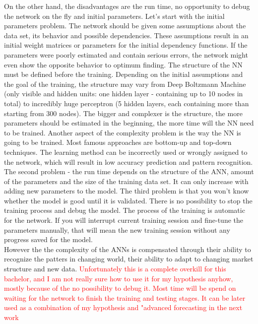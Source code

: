\documentclass[12pt, a4paper]{article}
\begin{document}
On the other hand, the disadvantages are the run time, no opportunity to debug the network on the fly and initial parameters. Let's start with the initial parameters problem. The network should be given some assumptions about the data set, its behavior and possible dependencies. These assumptions result in an initial weight matrices or parameters for the initial dependency functions. If the parameters were poorly estimated and contain serious errors, the network might even show the opposite behavior to optimum finding. The structure of the NN must be defined before the training. Depending on the initial assumptions and the goal of the training, the structure may vary from Deep Boltzmann Machine (only visible and hidden units: one hidden layer - containing up to 10 nodes in total) to incredibly huge perceptron (5 hidden layers, each containing more than starting from 300 nodes). The bigger and complexer is the structure, the more parameters should be estimated in the beginning, the more time will the NN need to be trained. Another aspect of the complexity problem is the way the NN is going to be trained. Most famous approaches are bottom-up and top-down techniques. The learning method can be incorrectly used or wrongly assigned to the network, which will result in low accuracy prediction and pattern recognition. The second problem - the run time depends on the structure of the ANN, amount of the parameters and the size of the training data set. It can only increase with adding new parameters to the model. The third problem is that you won't know whether the model is good until it is validated. There is no possibility to stop the training process and debug the model. The process of the training is automatic for the network. If you will interrupt current training session and fine-tune the parameters manually, that will mean the new training session without any progress saved for the model.\\
However the the complexity of the ANNs is compensated through their ability to recognize the patters in changing world, their ability to adapt to changing market structure and new data. \textcolor{red}{Unfortunately this is a complete overkill for this bachelor, and I am not really sure how to use it for my hypothesis anyhow, mostly because of the no possibility to debug it. Most time will be spend on waiting for the network to finish the training and testing stages. It can be later used as a combination of my hypothesis and "advanced forecasting in the next work} \\
\end{document}
